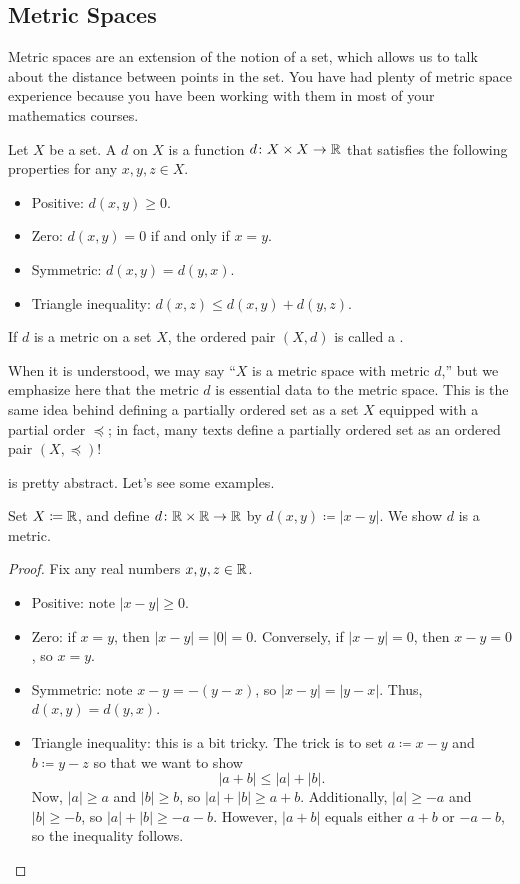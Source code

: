 \documentclass[../main.tex]{subfiles}
\begin{document}
\subsection{Metric Spaces}
Metric spaces are an extension of the notion of a set, which allows us to talk about the distance between points in the set. You have had plenty of metric space experience because you have been working with them in most of your mathematics courses.
\begin{definition} \label{def:metric-space}
    Let $X$ be a set. A  $d$ on $X$ is a function $d\colon X \times X \rightarrow \mathbb R$ that satisfies the following properties for any $x,y,z\in X$.
    \begin{itemize}
        \item Positive: $d(x,y) \geq 0$.
        \item Zero: $d(x,y) = 0$ if and only if $x=y$.
        \item Symmetric: $d(x,y) = d(y,x)$. 
        \item Triangle inequality: $d(x,z) \leq d(x,y) + d(y,z)$.
    \end{itemize}
    If $d$ is a metric on a set $X$, the ordered pair $(X,d)$ is called a .
\end{definition}
\begin{remark}
    When it is understood, we may say ``$X$ is a metric space with metric $d$,'' but we emphasize here that the metric $d$ is essential data to the metric space. This is the same idea behind defining a partially ordered set as a set $X$ equipped with a partial order $\preceq$; in fact, many texts define a partially ordered set as an ordered pair $(X,\preceq)$!
\end{remark}
 is pretty abstract. Let's see some examples.
\begin{example}
    Set $X\coloneqq\mathbb R$, and define $d\colon\mathbb R\times\mathbb R\to\mathbb R$ by $d(x,y)\coloneqq|x-y|$. We show $d$ is a metric.
\end{example}
\begin{proof}
    Fix any real numbers $x,y,z\in\mathbb R$.
    \begin{itemize}
        \item Positive: note $|x-y|\ge0$.
        \item Zero: if $x=y$, then $|x-y|=|0|=0$. Conversely, if $|x-y|=0$, then $x-y=0$, so $x=y$.
        \item Symmetric: note $x-y=-(y-x)$, so $|x-y|=|y-x|$. Thus, $d(x,y)=d(y,x)$.
        \item Triangle inequality: this is a bit tricky. The trick is to set $a\coloneqq x-y$ and $b\coloneqq y-z$ so that we want to show
        \[|a+b|\le|a|+|b|.\]
        Now, $|a|\ge a$ and $|b|\ge b$, so $|a|+|b|\ge a+b$. Additionally, $|a|\ge-a$ and $|b|\ge-b$, so $|a|+|b|\ge-a-b$. However, $|a+b|$ equals either $a+b$ or $-a-b$, so the inequality follows.
        \qedhere
    \end{itemize}
\end{proof}
\end{document}
